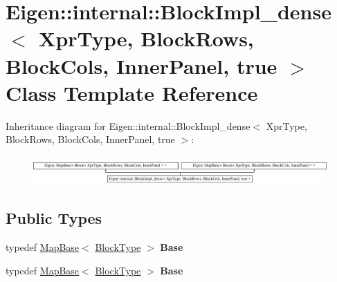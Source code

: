 \hypertarget{class_eigen_1_1internal_1_1_block_impl__dense_3_01_xpr_type_00_01_block_rows_00_01_block_cols_00_01_inner_panel_00_01true_01_4}{}\section{Eigen\+:\+:internal\+:\+:Block\+Impl\+\_\+dense$<$ Xpr\+Type, Block\+Rows, Block\+Cols, Inner\+Panel, true $>$ Class Template Reference}
\label{class_eigen_1_1internal_1_1_block_impl__dense_3_01_xpr_type_00_01_block_rows_00_01_block_cols_00_01_inner_panel_00_01true_01_4}
Inheritance diagram for Eigen\+:\+:internal\+:\+:Block\+Impl\+\_\+dense$<$ Xpr\+Type, Block\+Rows, Block\+Cols, Inner\+Panel, true $>$\+:\begin{figure}[H]
\begin{center}
\leavevmode
\includegraphics[height=1.100196cm]{class_eigen_1_1internal_1_1_block_impl__dense_3_01_xpr_type_00_01_block_rows_00_01_block_cols_00_01_inner_panel_00_01true_01_4}
\end{center}
\end{figure}
\subsection*{Public Types}
\begin{DoxyCompactItemize}
\item 
\mbox{\label{class_eigen_1_1internal_1_1_block_impl__dense_3_01_xpr_type_00_01_block_rows_00_01_block_cols_00_01_inner_panel_00_01true_01_4_a1c15fa6e6d001b1dd257885b13258b2b}} 
typedef \hyperlink{class_eigen_1_1_map_base}{Map\+Base}$<$ \hyperlink{group___core___module_class_eigen_1_1_block}{Block\+Type} $>$ {\bfseries Base}
\item 
\mbox{\label{class_eigen_1_1internal_1_1_block_impl__dense_3_01_xpr_type_00_01_block_rows_00_01_block_cols_00_01_inner_panel_00_01true_01_4_a1c15fa6e6d001b1dd257885b13258b2b}} 
typedef \hyperlink{class_eigen_1_1_map_base}{Map\+Base}$<$ \hyperlink{group___core___module_class_eigen_1_1_block}{Block\+Type} $>$ {\bfseries Base}
\end{DoxyCompactItemize}
